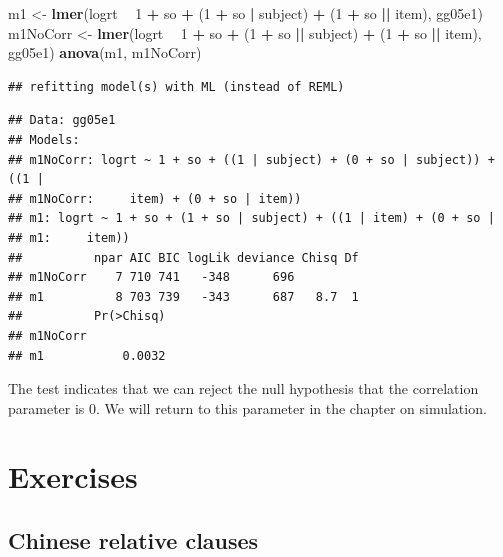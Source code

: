 \documentclass[12pt,]{krantz}
\newenvironment{Shaded}{\begin{snugshade}}{\end{snugshade}}
\newcommand{\DecValTok}[1]{\textcolor[rgb]{0.00,0.00,0.81}{#1}}
\newcommand{\KeywordTok}[1]{\textcolor[rgb]{0.13,0.29,0.53}{\textbf{#1}}}
\newcommand{\NormalTok}[1]{#1}
\newcommand{\OperatorTok}[1]{\textcolor[rgb]{0.81,0.36,0.00}{\textbf{#1}}}
\newcommand{\StringTok}[1]{\textcolor[rgb]{0.31,0.60,0.02}{#1}}
\begin{document}
\begin{Shaded}
\begin{Highlighting}[]
\NormalTok{m1 <-}\StringTok{ }\KeywordTok{lmer}\NormalTok{(logrt }\OperatorTok{~}\StringTok{ }\DecValTok{1} \OperatorTok{+}\StringTok{ }\NormalTok{so }\OperatorTok{+}\StringTok{ }\NormalTok{(}\DecValTok{1} \OperatorTok{+}\StringTok{ }\NormalTok{so }\OperatorTok{|}\StringTok{ }\NormalTok{subject) }\OperatorTok{+}\StringTok{ }
\StringTok{  }\NormalTok{(}\DecValTok{1} \OperatorTok{+}\StringTok{ }\NormalTok{so }\OperatorTok{||}\StringTok{ }\NormalTok{item), gg05e1)}
\NormalTok{m1NoCorr <-}\StringTok{ }\KeywordTok{lmer}\NormalTok{(logrt }\OperatorTok{~}\StringTok{ }\DecValTok{1} \OperatorTok{+}\StringTok{ }\NormalTok{so }\OperatorTok{+}\StringTok{ }\NormalTok{(}\DecValTok{1} \OperatorTok{+}\StringTok{ }\NormalTok{so }\OperatorTok{||}\StringTok{ }
\StringTok{  }\NormalTok{subject) }\OperatorTok{+}\StringTok{ }\NormalTok{(}\DecValTok{1} \OperatorTok{+}\StringTok{ }\NormalTok{so }\OperatorTok{||}\StringTok{ }\NormalTok{item), gg05e1)}
\KeywordTok{anova}\NormalTok{(m1, m1NoCorr)}
\end{Highlighting}
\end{Shaded}

\begin{verbatim}
## refitting model(s) with ML (instead of REML)
\end{verbatim}

\begin{verbatim}
## Data: gg05e1
## Models:
## m1NoCorr: logrt ~ 1 + so + ((1 | subject) + (0 + so | subject)) + ((1 | 
## m1NoCorr:     item) + (0 + so | item))
## m1: logrt ~ 1 + so + (1 + so | subject) + ((1 | item) + (0 + so | 
## m1:     item))
##          npar AIC BIC logLik deviance Chisq Df
## m1NoCorr    7 710 741   -348      696         
## m1          8 703 739   -343      687   8.7  1
##          Pr(>Chisq)
## m1NoCorr           
## m1           0.0032
\end{verbatim}

The test indicates that we can reject the null hypothesis that the correlation parameter is 0. We will return to this parameter in the chapter on simulation.

\hypertarget{sec:HypTestExercises}{%
\section{Exercises}\label{sec:HypTestExercises}}

\hypertarget{sec:HypTestExercisesChinese}{%
\subsection{Chinese relative clauses}\label{sec:HypTestExercisesChinese}}
\end{document}
